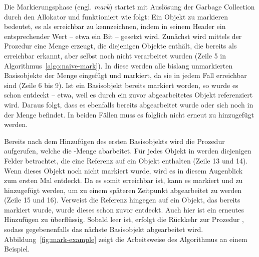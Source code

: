 Die Markierungsphase (engl. \textit{mark}) startet mit Auslösung der Garbage Collection durch den Allokator und funktioniert wie folgt:
Ein Objekt zu markieren bedeutet, es als erreichbar zu kennzeichnen, indem in seinem Header ein entsprechender Wert -- etwa ein Bit -- gesetzt wird.
Zunächst wird mittels der Prozedur  eine Menge  erzeugt, die diejenigen Objekte enthält, die bereits als erreichbar erkannt, aber selbst noch nicht verarbeitet wurden (Zeile 5 in Algorithmus~\ref{algo:naive-mark}).
In diese werden alle bislang unmarkierten Basisobjekte der Menge \Roots eingefügt und markiert, da sie in jedem Fall erreichbar sind (Zeile 6 bis 9).
Ist ein Basisobjekt bereits markiert worden, so wurde es schon entdeckt -- etwa, weil es durch ein zuvor abgearbeitetes Objekt referenziert wird.
Daraus folgt, dass es ebenfalls bereits abgearbeitet wurde oder sich noch in der Menge  befindet.
In beiden Fällen muss es folglich nicht erneut zu  hinzugefügt werden.

Bereits nach dem Hinzufügen des ersten Basisobjekts wird die Prozedur  aufgerufen, welche die -Menge abarbeitet.
Für jedes Objekt in  werden diejenigen Felder betrachtet, die eine Referenz auf ein Objekt enthalten (Zeile 13 und 14).
Wenn dieses Objekt noch nicht markiert wurde, wird es in diesem Augenblick zum ersten Mal entdeckt.
Da es somit erreichbar ist, kann es markiert und zu  hinzugefügt werden, um zu einem späteren Zeitpunkt abgearbeitet zu werden (Zeile 15 und 16).
Verweist die Referenz hingegen auf ein Objekt, das bereits markiert wurde, wurde dieses schon zuvor entdeckt.
Auch hier ist ein erneutes Hinzufügen zu  überflüssig.
Sobald  leer ist, erfolgt die Rückkehr zur Prozedur , sodass gegebenenfalls das nächste Basisobjekt abgearbeitet wird.
Abbildung~\ref{fig:mark-example} zeigt die Arbeitsweise des Algorithmus an einem Beispiel.

